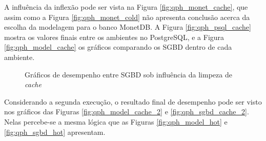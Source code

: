 A influência da inflexão pode ser vista na Figura \ref{fig:qph_monet_cache}, que assim como a Figura \ref{fig:qph_monet_cold} não apresenta conclusão acerca da escolha da modelagem para o banco MonetDB. A Figura \ref{fig:qph_psql_cache} mostra os valores finais entre os ambientes no PostgreSQL, e a Figura \ref{fig:qph_model_cache} os gráficos comparando os SGBD dentro de cada ambiente.
    
\begin{figure}[htpb]
        \centering
        \caption{Gráficos de desempenho entre SGBD sob influência da limpeza de \textit{cache}}
        \label{fig:qph_sgbd_cache}
\end{figure}

Considerando a segunda execução, o resultado final de desempenho pode ser visto nos gráficos das Figuras \ref{fig:qph_model_cache_2} e \ref{fig:qph_sgbd_cache_2}. Nelas percebe-se a mesma lógica que as Figuras \ref{fig:qph_model_hot} e \ref{fig:qph_sgbd_hot} apresentam.

